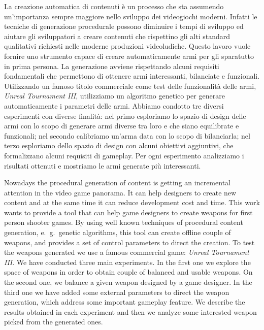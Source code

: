 \documentclass[12pt, italian]{toptesi}
\begin{document}
La creazione automatica di contenuti è un processo che sta assumendo un'importanza sempre maggiore nello sviluppo dei videogiochi moderni.
Infatti le tecniche di generazione procedurale possono diminuire i tempi di sviluppo ed aiutare gli sviluppatori a creare contenuti che rispettino gli alti standard qualitativi richiesti nelle moderne produzioni videoludiche.
Questo lavoro vuole fornire uno strumento capace di creare automaticamente armi per gli sparatutto in prima persona.
La generazione avviene rispettando alcuni requisiti fondamentali che permettono di ottenere armi interessanti, bilanciate e funzionali.
Utilizzando un famoso titolo commerciale come test delle funzionalità delle armi, \emph{Unreal Tournament III}, utilizziamo un algoritmo genetico per generare automaticamente i parametri delle armi.
Abbiamo condotto tre diversi esperimenti con diverse finalità: nel primo esploriamo lo spazio di design delle armi con lo scopo di generare armi diverse tra loro e che siano equilibrate e funzionali;
nel secondo calibriamo un'arma data con lo scopo di bilanciarla; nel terzo esploriamo dello spazio di design con alcuni obiettivi aggiuntivi, che formalizzano alcuni requisiti di gameplay.
Per ogni esperimento analizziamo i risultati ottenuti e mostriamo le armi generate più interessanti.


\abstract
Nowadays the procedural generation of content is getting an incremental attention in the video game panorama.
It can help designers to create new content and at the same time it can reduce development cost and time.
This work wants to provide a tool that can help game designers to create weapons for first person shooter games.
By using well known techniques of procedural content generation, e.~g.~genetic algorithms, this tool
can create offline couple of weapons, and provides a set of control parameters to direct the creation.
To test the weapons generated we use a famous commercial game: \emph{Unreal Tournament III}.
We have conducted three main experiments.
In the first one we explore the space of weapons in order to obtain couple of balanced and usable weapons.
On the second one, we balance a given weapon designed by a game designer.
In the third one we have added some external parameters to direct the weapon generation, which address some important gameplay feature.
We describe the results obtained in each experiment and then we analyze some interested weapon picked from the generated ones. 

\end{document}
